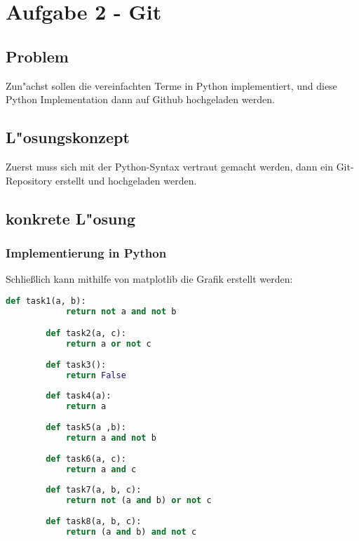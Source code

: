 \documentclass[a4paper,11pt,titlepage]{article}
\begin{document}
    \section{Aufgabe 2 - Git}

    \subsection{Problem}
    Zun"achst sollen die vereinfachten Terme in Python implementiert, und diese Python Implementation dann auf Github hochgeladen werden.

    \subsection{L"osungskonzept}
    Zuerst muss sich mit der Python-Syntax vertraut gemacht werden, dann ein Git-Repository erstellt und hochgeladen werden.

    \subsection{konkrete L"osung}

    \subsubsection{Implementierung in Python}
    Schließlich kann mithilfe von matplotlib die Grafik erstellt werden:
    \begin{lstlisting}[language=Python]
        def task1(a, b):
            return not a and not b

        def task2(a, c):
            return a or not c
        
        def task3():
            return False
        
        def task4(a):
            return a
        
        def task5(a ,b):
            return a and not b
        
        def task6(a, c):
            return a and c
        
        def task7(a, b, c):
            return not (a and b) or not c
        
        def task8(a, b, c):
            return (a and b) and not c
    \end{lstlisting}
\end{document}
